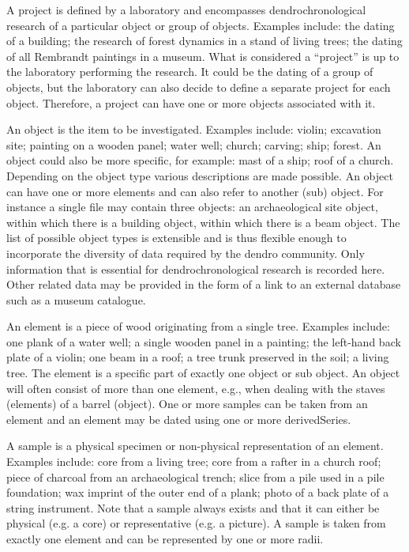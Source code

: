 \begin{description*}

\item{A project} is defined by a laboratory and encompasses dendrochronological research of a particular object or group of objects. Examples include: the dating of a building; the research of forest dynamics in a stand of living trees; the dating of all Rembrandt paintings in a museum. What is considered a “project” is up to the laboratory performing the research. It could be the dating of a group of objects, but the laboratory can also decide to define a separate project for each object. Therefore, a project can have one or more objects associated with it.

\item{An object} is the item to be investigated. Examples include: violin; excavation site; painting on a wooden panel; water well; church; carving; ship; forest. An object could also be more specific, for example: mast of a ship; roof of a church. Depending on the object type various descriptions are made possible. An object can have one or more elements and can also refer to another (sub) object. For instance a single file may contain three objects: an archaeological site object, within which there is a building object, within which there is a beam object. The list of possible object types is extensible and is thus flexible enough to incorporate the diversity of data required by the dendro community. Only information that is essential for dendrochronological research is recorded here. Other related data may be provided in the form of a link to an external database such as a museum catalogue.

\item{An element} is a piece of wood originating from a single tree. Examples include: one plank of a water well; a single wooden panel in a painting; the left-hand back plate of a violin; one beam in a roof; a tree trunk preserved in the soil; a living tree. The element is a specific part of exactly one object or sub object. An object will often consist of more than one element, e.g., when dealing with the staves (elements) of a barrel (object). One or more samples can be taken from an element and an element may be dated using one or more derivedSeries.

\item{A sample} is a physical specimen or non-physical representation of an element. Examples include: core from a living tree; core from a rafter in a church roof; piece of charcoal from an archaeological trench; slice from a pile used in a pile foundation; wax imprint of the outer end of a plank; photo of a back plate of a string instrument. Note that a sample always exists and that it can either be physical (e.g. a core) or representative (e.g. a picture). A sample is taken from exactly one element and can be represented by one or more radii.


\end{description*}

